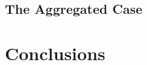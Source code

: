     

    \section{The Aggregated Case} \label{sec:log-set-memb-Z}
        
        

        
%        

\chapter{Conclusions}

        
